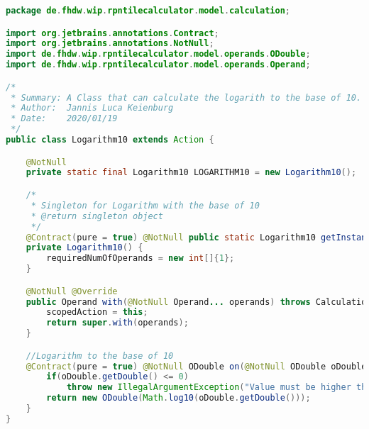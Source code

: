 \begin{lstlisting}[caption=Logarithm10 (Keienburg),label=list:Logarithm10,language=Java]
package de.fhdw.wip.rpntilecalculator.model.calculation;

import org.jetbrains.annotations.Contract;
import org.jetbrains.annotations.NotNull;
import de.fhdw.wip.rpntilecalculator.model.operands.ODouble;
import de.fhdw.wip.rpntilecalculator.model.operands.Operand;

/*
 * Summary: A Class that can calculate the logarith to the base of 10. 
 * Author:  Jannis Luca Keienburg
 * Date:    2020/01/19
 */
public class Logarithm10 extends Action {

    @NotNull
    private static final Logarithm10 LOGARITHM10 = new Logarithm10();

    /*
     * Singleton for Logarithm with the base of 10
     * @return singleton object
     */
    @Contract(pure = true) @NotNull public static Logarithm10 getInstance() { return LOGARITHM10; }
    private Logarithm10() {
        requiredNumOfOperands = new int[]{1};
    }

    @NotNull @Override
    public Operand with(@NotNull Operand... operands) throws CalculationException {
        scopedAction = this;
        return super.with(operands);
    }

    //Logarithm to the base of 10
    @Contract(pure = true) @NotNull ODouble on(@NotNull ODouble oDouble) {
        if(oDouble.getDouble() <= 0)
            throw new IllegalArgumentException("Value must be higher than Zero.");
        return new ODouble(Math.log10(oDouble.getDouble()));
    }
}
\end{lstlisting}  

